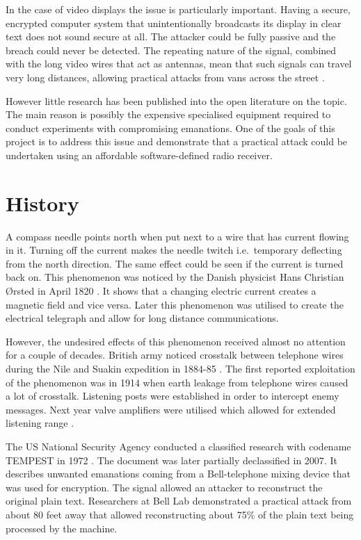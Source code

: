 \documentclass[a4paper,12pt,twoside,openright]{report}
\begin{document}
In the case of video displays the issue is particularly important. Having a secure, encrypted computer system that unintentionally broadcasts its display in clear text does not sound secure at all. The attacker could be fully passive and the breach could never be detected. The repeating nature of the signal, combined with the long video wires that act as antennas, mean that such signals can travel very long distances, allowing practical attacks from vans across the street \cite{van1985electromagnetic}.

However little research has been published into the open literature on the topic. The main reason is possibly the expensive specialised equipment required to conduct experiments with compromising emanations. One of the goals of this project is to address this issue and demonstrate that a practical attack could be undertaken using an affordable software-defined radio receiver.

\section{History}

A compass needle points north when put next to a wire that has current flowing in it. Turning off the current makes the needle twitch i.e.\  temporary deflecting from the north direction. The same effect could be seen if the current is turned back on. This phenomenon was noticed by the Danish physicist Hans Christian \O rsted in April 1820 \cite{jelved1998selected}. It shows that a changing electric current creates a magnetic field and vice versa. Later this phenomenon was utilised to create the electrical telegraph and allow for long distance communications.

However, the undesired effects of this phenomenon received almost no attention for a couple of decades. British army noticed crosstalk between telephone wires during the Nile and Suakin expedition in 1884-85 \cite{nalder1958history}. The first reported exploitation of the phenomenon was in 1914 when earth leakage from telephone wires caused a lot of crosstalk. Listening posts were established in order to intercept enemy messages. Next year valve amplifiers were utilised which allowed for extended listening range \cite{anderson2008security}.

The US National Security Agency conducted a classified research with codename TEMPEST in 1972 \cite{friedman2007tempest}. The document was later partially declassified in 2007. It describes unwanted emanations coming from a Bell-telephone mixing device that was used for encryption. The signal allowed an attacker to reconstruct the original plain text. Researchers at Bell Lab demonstrated a practical attack from about 80 feet away that allowed reconstructing about 75\% of the plain text being processed by the machine.
\end{document}
